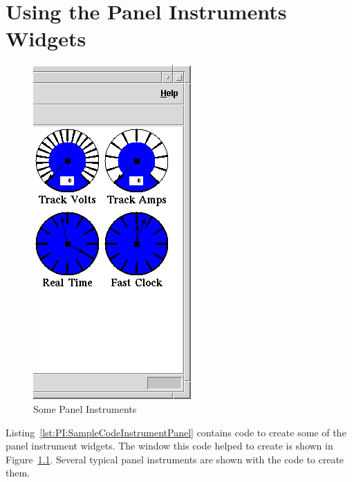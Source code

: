 \chapter{Using the Panel Instruments Widgets}
\label{chapt:PanelInstruments}

\begin{figure}[hbpt]
\begin{centering}
\includegraphics{PanelInstrument.png}
\caption{Some Panel Instruments}
\label{fig:PI:PanelInstrument}
\end{centering}
\end{figure}
Listing~\ref{lst:PI:SampleCodeInstrumentPanel} contains code to create
some of the panel instrument widgets.  The window this code helped to
create is shown in Figure~\ref{fig:PI:PanelInstrument}. Several typical
panel instruments are shown with the code to create them.

